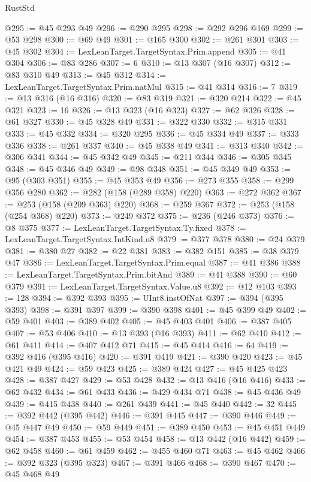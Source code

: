 \begin{lexlean}{RustStd}
\begin{coremodule}
@295 := @45 @293 @49
@296 := @290 @295
@298 := @292 @296 @169
@299 := @53 @298
@300 := @69 @49
@301 := @165 @300
@302 := @261 @301
@303 := @45 @302
@304 := LexLeanTarget.TargetSyntax.Prim.append
@305 := @41 @304
@306 := @83 @286
@307 := 6
@310 := @13 @307 (@16 @307)
@312 := @83 @310 @49
@313 := @45 @312
@314 := LexLeanTarget.TargetSyntax.Prim.natMul
@315 := @41 @314
@316 := 7
@319 := @13 @316 (@16 @316)
@320 := @83 @319
@321 := @320 @214
@322 := @45 @321
@323 := 16
@326 := @13 @323 (@16 @323)
@327 := @62 @326
@328 := @61 @327
@330 := @45 @328 @49
@331 := @322 @330
@332 := @315 @331
@333 := @45 @332
@334 := @320 @295
@336 := @45 @334 @49
@337 := @333 @336
@338 := @261 @337
@340 := @45 @338 @49
@341 := @313 @340
@342 := @306 @341
@344 := @45 @342 @49
@345 := @211 @344
@346 := @305 @345
@348 := @45 @346 @49
@349 := @98 @348
@351 := @45 @349 @49
@353 := @95 (@303 @351)
@355 := @45 @353 @49
@356 := @273 @355
@358 := @299 @356 @280
@362 := @282 (@158 (@289 @358) @220)
@363 := @272 @362
@367 := @253 (@158 (@209 @363) @220)
@368 := @259 @367
@372 := @253 (@158 (@254 @368) @220)
@373 := @249 @372
@375 := @236 (@246 @373)
@376 := @8 @375
@377 := LexLeanTarget.TargetSyntax.Ty.fixed
@378 := LexLeanTarget.TargetSyntax.IntKind.u8
@379 := @377 @378
@380 := @24 @379
@381 := @380 @27
@382 := @22 @381
@383 := @382 @151
@385 := @38 @379 @47
@386 := LexLeanTarget.TargetSyntax.Prim.equal
@387 := @41 @386
@388 := LexLeanTarget.TargetSyntax.Prim.bitAnd
@389 := @41 @388
@390 := @60 @379
@391 := LexLeanTarget.TargetSyntax.Value.u8
@392 := @12 @103
@393 := 128
@394 := @392 @393
@395 := UInt8.instOfNat
@397 := @394 (@395 @393)
@398 := @391 @397
@399 := @390 @398
@401 := @45 @399 @49
@402 := @59 @401
@403 := @389 @402
@405 := @45 @403 @401
@406 := @387 @405
@407 := @53 @406
@410 := @13 @393 (@16 @393)
@411 := @62 @410
@412 := @61 @411
@414 := @407 @412 @71
@415 := @45 @414
@416 := 64
@419 := @392 @416 (@395 @416)
@420 := @391 @419
@421 := @390 @420
@423 := @45 @421 @49
@424 := @59 @423
@425 := @389 @424
@427 := @45 @425 @423
@428 := @387 @427
@429 := @53 @428
@432 := @13 @416 (@16 @416)
@433 := @62 @432
@434 := @61 @433
@436 := @429 @434 @71
@438 := @45 @436 @49
@439 := @415 @438
@440 := @261 @439
@441 := @45 @440
@442 := 32
@445 := @392 @442 (@395 @442)
@446 := @391 @445
@447 := @390 @446
@449 := @45 @447 @49
@450 := @59 @449
@451 := @389 @450
@453 := @45 @451 @449
@454 := @387 @453
@455 := @53 @454
@458 := @13 @442 (@16 @442)
@459 := @62 @458
@460 := @61 @459
@462 := @455 @460 @71
@463 := @45 @462
@466 := @392 @323 (@395 @323)
@467 := @391 @466
@468 := @390 @467
@470 := @45 @468 @49

\end{coremodule}
\end{lexlean}
